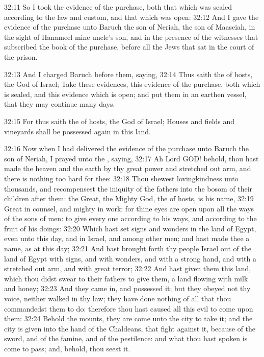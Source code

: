 32:11 So I took the evidence of the purchase, both that which was sealed according to the law and custom, and that which was open: 32:12 And I gave the evidence of the purchase unto Baruch the son of Neriah, the son of Maaseiah, in the sight of Hanameel mine uncle's son, and in the presence of the witnesses that subscribed the book of the purchase, before all the Jews that sat in the court of the prison.

32:13 And I charged Baruch before them, saying, 32:14 Thus saith the \LORD of hosts, the God of Israel; Take these evidences, this evidence of the purchase, both which is sealed, and this evidence which is open; and put them in an earthen vessel, that they may continue many days.

32:15 For thus saith the \LORD of hosts, the God of Israel; Houses and fields and vineyards shall be possessed again in this land.

32:16 Now when I had delivered the evidence of the purchase unto Baruch the son of Neriah, I prayed unto the \LORD, saying, 32:17 Ah Lord GOD! behold, thou hast made the heaven and the earth by thy great power and stretched out arm, and there is nothing too hard for thee: 32:18 Thou shewest lovingkindness unto thousands, and recompensest the iniquity of the fathers into the bosom of their children after them: the Great, the Mighty God, the \LORD of hosts, is his name, 32:19 Great in counsel, and mighty in work: for thine eyes are open upon all the ways of the sons of men: to give every one according to his ways, and according to the fruit of his doings: 32:20 Which hast set signs and wonders in the land of Egypt, even unto this day, and in Israel, and among other men; and hast made thee a name, as at this day; 32:21 And hast brought forth thy people Israel out of the land of Egypt with signs, and with wonders, and with a strong hand, and with a stretched out arm, and with great terror; 32:22 And hast given them this land, which thou didst swear to their fathers to give them, a land flowing with milk and honey; 32:23 And they came in, and possessed it; but they obeyed not thy voice, neither walked in thy law; they have done nothing of all that thou commandedst them to do: therefore thou hast caused all this evil to come upon them: 32:24 Behold the mounts, they are come unto the city to take it; and the city is given into the hand of the Chaldeans, that fight against it, because of the sword, and of the famine, and of the pestilence: and what thou hast spoken is come to pass; and, behold, thou seest it.


